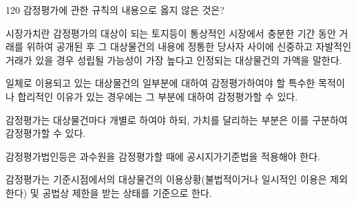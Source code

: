 \begin{question}{120}
감정평가에 관한 규칙의 내용으로 옳지 않은 것은?
\begin{choices}
  \item 시장가치란 감정평가의 대상이 되는 토지등이 통상적인 시장에서 충분한 기간 동안 거래를 위하여 공개된 후 그 대상물건의 내용에 정통한 당사자 사이에 신중하고 자발적인 거래가 있을 경우 성립될 가능성이 가장 높다고 인정되는 대상물건의 가액을 말한다.
  \item 일체로 이용되고 있는 대상물건의 일부분에 대하여 감정평가하여야 할 특수한 목적이나 합리적인 이유가 있는 경우에는 그 부분에 대하여 감정평가할 수 있다.
  \item 감정평가는 대상물건마다 개별로 하여야 하되, 가치를 달리하는 부분은 이를 구분하여 감정평가할 수 있다.
  \item 감정평가법인등은 과수원을 감정평가할 때에 공시지가기준법을 적용해야 한다.
  \item 감정평가는 기준시점에서의 대상물건의 이용상황(불법적이거나 일시적인 이용은 제외한다) 및 공법상 제한을 받는 상태를 기준으로 한다.
\end{choices}
\end{question}
